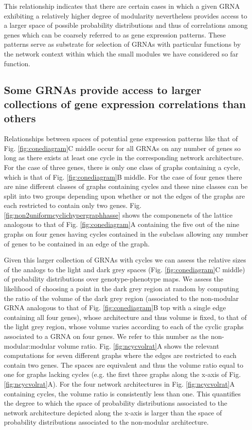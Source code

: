 This relationship indicates that there are certain cases in which a given GRNA exhibiting a relatively higher degree of modularity nevertheless provides access to a larger space of possible probability distributions and thus of correlations among genes which can be coarsely referred to as gene expression patterns. These patterns serve as substrate for selection of GRNAs with particular functions by the network context within which the small modules we have considered so far function.

\subsection*{Some GRNAs provide access to larger collections of gene expression correlations than others}
Relationships between spaces of potential gene expression patterns like that of Fig. \ref{fig:conediagram}C middle occur for all GRNAs on any number of genes so long as there exists at least one cycle in the corresponding network architecture. For the case of three genes, there is only one class of graphs containing a cycle, which is that of Fig. \ref{fig:conediagram}B middle. For the case of four genes there are nine different classes of graphs containing cycles and these nine classes can be split into two groups depending upon whether or not the edges of the graphs are each restricted to contain only two genes. Fig. \ref{fig:non2uniformcyclichypergraphhasse} shows the componenets of the lattice analogous to that of Fig. \ref{fig:conediagram}A containing the five out of the nine graphs on four genes having cycles contained in the subclass allowing any number of genes to be contained in an edge of the graph.

Given this larger collection of GRNAs with cycles we can assess the relative sizes of the analogs to the light and dark grey spaces (Fig. \ref{fig:conediagram}C middle) of probability distributions over genotype-phenotype maps. We assess the likelihood of choosing a point in the dark grey region at random by computing the ratio of the volume of the dark grey region (associated to the non-modular GRNA analogous to that of Fig. \ref{fig:conediagram}B top with a single edge containing all four genes), whose architecture and thus volume is fixed, to that of the light grey region, whose volume varies according to each of the cyclic graphs associated to a GRNA on four genes. We refer to this number as the non-modular:modular volume ratio. Fig. \ref{fig:ncycvolrat}A shows the relevant computations for seven different graphs where the edges are restricted to each contain two genes. The spaces are equivalent and thus the volume ratio equal to one for graphs lacking cycles (e.g. the first three graphs along the x-axis of Fig. \ref{fig:ncycvolrat}A). For the four network architectures in Fig. \ref{fig:ncycvolrat}A containing cycles, the volume ratio is consistently less than one. This quantifies the degree to which the space of probability distributions associated to the network architecture depicted along the x-axis is larger than the space of probability distributions associated to the non-modular architecture.

